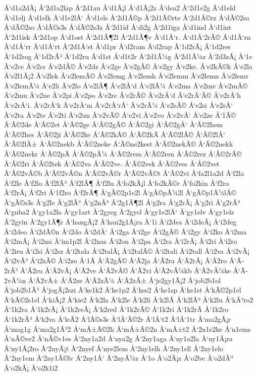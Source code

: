 {Å‘d1a2dÃ¡
Å‘2d1a2lap
Å‘2d1au
Å‘d1Ã¡l
Å‘d1Ã¡2z
Å‘dea2
Å‘2d1e2g
Å‘d1eld
Å‘d1elj
Å‘d1elk
Å‘d1e2lÅ‘
Å‘d1els
Å‘2d1Ã©p
Å‘2d1Ã©rte
Å‘2d1Ã©rz
Å‘dÃ©2sa
Å‘dÃ©2so
Å‘dÃ©s3s
Å‘dÃ©2s3z
Å‘2d1id
Å‘di2g
Å‘2d1iga
Å‘d1ind
Å‘d1int
Å‘2d1isk
Å‘2d1op
Å‘d1ost
Å‘2d1Ã¶2l
Å‘2d1Ã¶v
Å‘d1Å‘r.
Å‘d1Å‘2rÃ©
Å‘d1Å‘rn
Å‘d1Å‘rr
Å‘d1Å‘rt
Å‘2d1Å‘st
Å‘d1pr
Å‘d2ram
Å‘d2rap
Å‘1d2rÃ¡
Å‘1d2res
Å‘1d2rog
Å‘1d2rÃ³
Å‘1d2ru
Å‘d1st
Å‘d1t2r
Å‘2d1Ã¼g
Å‘2d1Ã¼z
Å‘2d3zÃ¡
Å‘1e
Å‘e2ce
Å‘e2cs
Å‘e2dÃ©
Å‘e2dz
Å‘e2ge
Å‘e2gÃ©
Å‘e2gy
Å‘e2ke.
Å‘e2kÃ©k
Å‘e2la
Å‘e2l1Ã¡2
Å‘e2lek
Å‘e2lemÃ©
Å‘e2lemg
Å‘e2lemh
Å‘e2lemm
Å‘e2lemn
Å‘e2lemr
Å‘e2lemÃ¼
Å‘e2li
Å‘e2lo
Å‘e2lÃ¶
Å‘e2lÅ‘d
Å‘e2lÃ¼
Å‘e2ma
Å‘e2me
Å‘e2mÃ©
Å‘e2mu
Å‘e2ne
Å‘e2pi
Å‘e2po
Å‘e2re
Å‘e2rÃ©
Å‘e2rÅ‘d
Å‘e2rÅ‘Ã©
Å‘e2rÅ‘h
Å‘e2rÅ‘i.
Å‘e2rÅ‘k
Å‘e2rÅ‘m
Å‘e2rÅ‘rÅ‘
Å‘e2rÃ¼
Å‘e2sÃ©
Å‘e2si
Å‘e2sÅ‘
Å‘e2ta
Å‘e2te
Å‘e2ti
Å‘e2un
Å‘e2vÃ©
Å‘e2vi
Å‘e2vo
Å‘e2vÅ‘
Å‘e2ze
Å‘1Ã©
Å‘Ã©2de
Å‘Ã©2et
Å‘Ã©2ge
Å‘Ã©2gÃ©
Å‘Ã©2gi
Å‘Ã©2gÅ‘
Å‘Ã©2hem
Å‘Ã©2hes
Å‘Ã©2ji
Å‘Ã©2ke
Å‘Ã©2kÃ©
Å‘Ã©2kÃ­
Å‘Ã©2lÃ©
Å‘Ã©2lÅ‘
Å‘Ã©2lÅ±
Å‘Ã©2nekb
Å‘Ã©2neke
Å‘Ã©ne2kest
Å‘Ã©2nekÃ©
Å‘Ã©2nekk
Å‘Ã©2nekr
Å‘Ã©2pÃ­
Å‘Ã©2pÃ¼
Å‘Ã©2rem
Å‘Ã©2ren
Å‘Ã©2rez
Å‘Ã©2rÃ©
Å‘Ã©2ri
Å‘Ã©2tek
Å‘Ã©2va
Å‘Ã©2ve.
Å‘Ã©2vek
Å‘Ã©2ves
Å‘Ã©2vet
Å‘Ã©2vÃ©b
Å‘Ã©2vÃ©n
Å‘Ã©2vÃ©r
Å‘Ã©2vÃ©t
Å‘Ã©2vi
Å‘fa2l1a2d
Å‘f2la
Å‘f2le
Å‘f2lo
Å‘f2lÃ³
Å‘f2lÃ¶
Å‘f2lu
Å‘fo2kÃ¡l
Å‘fo2kÃ©r
Å‘fo2kin
Å‘f2ra
Å‘f2rÃ¡
Å‘f2ri
Å‘1f2ro
Å‘f2rÃ¶
Å‘gÃ©2p1e2l
Å‘gÃ©pÃ¼2l
Å‘gÃ©p1Ã¼lÃ©
Å‘gÃ©s3s
Å‘g2le
Å‘g2lÃ³
Å‘g2nÃ³
Å‘2g1Ã¶2l
Å‘g2ra
Å‘g2rÃ¡
Å‘g2ri
Å‘g2rÃ³
Å‘guba2
Å‘gy1a2la
Å‘gy1art
Å‘2gyeg
Å‘2gyel
Å‘gy1e2lÅ‘
Å‘gy1elv
Å‘gy1elz
Å‘2gyin
Å‘2gy1Ã¶r
Å‘hangÃ¡2
Å‘han2g1Ã¡ra
Å‘1i
Å‘i2dea
Å‘i2deÃ¡
Å‘i2deg
Å‘i2deo
Å‘i2dÃ©n
Å‘i2do
Å‘i2dÅ‘
Å‘i2ga
Å‘i2ge
Å‘i2gÃ©
Å‘i2gy
Å‘i2ko
Å‘i2ma
Å‘i2mÃ¡
Å‘i2mi
Å‘im1p2l
Å‘i2nas
Å‘i2on
Å‘i2pa
Å‘i2ra
Å‘i2rÃ¡
Å‘i2ri
Å‘i2ro
Å‘2iru
Å‘i2si
Å‘i2sz
Å‘i2tala
Å‘i2talÃ¡
Å‘i2talÃ©
Å‘i2tali
Å‘i2tall
Å‘i2va
Å‘i2vÃ¡
Å‘i2vÃ³
Å‘i2zÃ©
Å‘i2zo
Å‘1Ã­
Å‘Ã­2gÃ©
Å‘Ã­2ja
Å‘Ã­2ra
Å‘Ã­2rÃ¡
Å‘Ã­2ro
Å‘Ã­2rÃ³
Å‘Ã­2ru
Å‘Ã­2vÃ¡
Å‘Ã­2ve
Å‘Ã­2vÃ©
Å‘Ã­2vi
Å‘Ã­2vÃ¼kb
Å‘Ã­2vÃ¼ke
Å‘Ã­2vÃ¼n
Å‘Ã­2vÅ±
Å‘Ã­2ze
Å‘Ã­2zÃ¼
Å‘Ã­2zÅ±
Å‘je2gy1Ã¡2
Å‘job2b1ol
Å‘job2b1Ã³
Å‘jogÃ¡2szi
Å‘ke1k2
Å‘ke1p2
Å‘kes2
Å‘ke1sp
Å‘ke1st
Å‘kÃ©2p1el
Å‘kÃ©2s1el
Å‘kiÃ¡2
Å‘kie2
Å‘k2la
Å‘k2le
Å‘k2li
Å‘k2lÃ­
Å‘k2lÃ³
Å‘k2lu
Å‘kÃ³ro2
Å‘1k2ra
Å‘1k2rÃ¡
Å‘1k2reÃ¡
Å‘k2red
Å‘1k2rÃ©
Å‘1k2ri
Å‘1k2rÃ­
Å‘1k2ro
Å‘1k2rÃ³
Å‘k2va
Å‘leÃ­2
Å‘lÃ©s3s
Å‘lÅ‘Ã©2r
Å‘lÅ‘t2
Å‘lÅ‘1tr
Å‘ma2gÃ¡r
Å‘mag1g
Å‘ma2g1Ã³2
Å‘mÅ±Ã©2h
Å‘mÅ±Ã©2n
Å‘mÅ±t2
Å‘2n1e2ke
Å‘n1ems
Å‘nÃ©ve2
Å‘nÃ©v1es
Å‘2ny1a2d
Å‘nya2g
Å‘2ny1aga
Å‘ny1a2la
Å‘ny1Ã¡ra
Å‘ny1Ã¡2ro
Å‘2nyÃ¡t
Å‘2nyef
Å‘nye2lem
Å‘2ny1elh
Å‘2ny1ell
Å‘2ny1elo
Å‘2ny1em
Å‘2ny1Ã©lv
Å‘2ny1Å‘
Å‘2nyÃ¼z
Å‘1o
Å‘o2Ã¡z
Å‘o2be
Å‘o2dÃº
Å‘o2kÃ¡
Å‘o2k1i2
}
